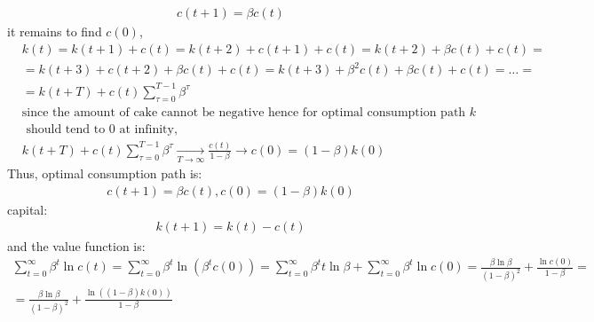 \documentclass[a4paper]{article}
\begin{document}
\begin{enumerate}
\begin{align*}
c(t+1) = \beta c(t)
\end{align*}
it remains to find $c(0)$,
\begin{align*}
&k(t) = k(t+1) + c(t) = k(t+2) + c(t+1) + c(t) = k(t+2) + \beta c(t) + c(t) = \\
&=k(t+3) + c(t+2) + \beta c(t) + c(t) = k(t+3) + \beta^2 c(t) + \beta c(t) + c(t) = \dots =\\
&=k(t + T) + c(t) \sum_{\tau = 0}^{T-1} \beta^{\tau} \\
&\text{since the amount of cake cannot be negative hence for optimal consumption path } k\\
&\text{ should tend to 0 at infinity, }\\
&k(t + T) + c(t) \sum_{\tau = 0}^{T-1} \beta^{\tau} \underset{T \to \infty}{\to} \frac{c(t)}{1-\beta} \to c(0) = (1-\beta)k(0)
\end{align*}
Thus, optimal consumption path is:
\begin{align*}
c(t+1) = \beta c(t), c(0) = (1-\beta)k(0)
\end{align*}
capital:
\begin{align*}
k(t+1) = k(t) - c(t)
\end{align*}
and the value function is:
\begin{align*}
\sum_{t=0}^{\infty} \beta^t \ln c(t) = \sum_{t=0}^{\infty} \beta^{t} \ln (\beta^t c(0)) = \sum_{t=0}^{\infty} \beta^t t \ln \beta + \sum_{t=0}^{\infty} \beta^t \ln c(0) = \frac{\beta \ln \beta}{(1-\beta)^2} + \frac{\ln c(0)}{1 - \beta } = \\
=\frac{\beta \ln \beta}{(1-\beta)^2} + \frac{\ln((1-\beta)k(0))}{1-\beta}
\end{align*}
\end{enumerate}
\end{document}
